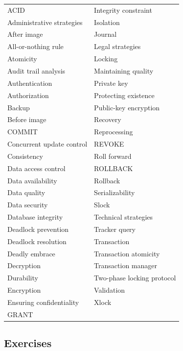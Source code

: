 \documentclass[
]{article}
\begin{document}
\begin{longtable}[]{@{}ll@{}}
\toprule
& \\
\midrule
\endhead
ACID & Integrity constraint \\
Administrative strategies & Isolation \\
After image & Journal \\
All-or-nothing rule & Legal strategies \\
Atomicity & Locking \\
Audit trail analysis & Maintaining quality \\
Authentication & Private key \\
Authorization & Protecting existence \\
Backup & Public-key encryption \\
Before image & Recovery \\
COMMIT & Reprocessing \\
Concurrent update control & REVOKE \\
Consistency & Roll forward \\
Data access control & ROLLBACK \\
Data availability & Rollback \\
Data quality & Serializability \\
Data security & Slock \\
Database integrity & Technical strategies \\
Deadlock prevention & Tracker query \\
Deadlock resolution & Transaction \\
Deadly embrace & Transaction atomicity \\
Decryption & Transaction manager \\
Durability & Two-phase locking protocol \\
Encryption & Validation \\
Ensuring confidentiality & Xlock \\
GRANT & \\
\bottomrule
\end{longtable}

\hypertarget{exercises-14}{%
\subsection*{Exercises}\label{exercises-14}}
\end{document}
